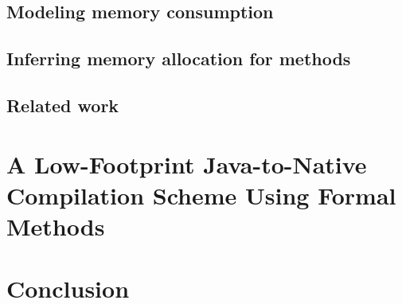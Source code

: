 \documentclass[book,10pt]{book}
\begin{document}
  \section{Modeling memory consumption}\label{sec:verif}
  
  
  \section{Inferring memory allocation for methods}\label{sec:infer}
  \label{sec:infer}
  \section{Related work}\label{sec:rel}
  

\chapter{A Low-Footprint Java-to-Native Compilation Scheme Using Formal Methods}
  \lstset{frameround=tttt}
  
  
  
  
  
  
   
   
  
 

\chapter{Conclusion}

\appendix
    
    
 


\end{document}
